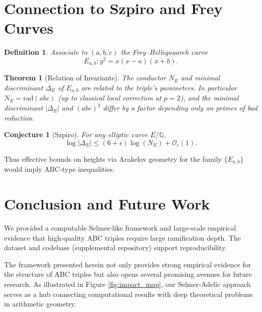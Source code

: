 \documentclass[11pt,a4paper]{article}
\newtheorem{definition}{Definition}[section]
\newtheorem{conjecture}{Conjecture}[section]
\newtheorem{theorem}{Theorem}[section]
\newcommand{\Q}{\mathbb{Q}}
\newcommand{\rad}{\mathrm{rad}}
\begin{document}
\section{Connection to Szpiro and Frey Curves}

\begin{definition}
Associate to $(a,b,c)$ the Frey--Hellegouarch curve
\[
E_{a,b}: y^2 = x(x-a)(x+b).
\]
\end{definition}

\begin{theorem}[Relation of Invariants]
The conductor $N_E$ and minimal discriminant $\Delta_E$ of $E_{a,b}$ are related to the triple's parameters. In particular $N_E=\rad(abc)$ (up to classical local correction at $p=2$), and the minimal discriminant $|\Delta_E|$ and $(abc)^2$ differ by a factor depending only on primes of bad reduction.
\end{theorem}

\begin{conjecture}[Szpiro]
For any elliptic curve $E/\Q$,
\[
\log|\Delta_E| \le (6+\epsilon)\log(N_E) + \mathcal{O}_\epsilon(1).
\]
\end{conjecture}

Thus effective bounds on heights via Arakelov geometry for the family $\{E_{a,b}\}$ would imply ABC-type inequalities.

\section{Conclusion and Future Work}

We provided a computable Selmer-like framework and large-scale empirical evidence that high-quality ABC triples require large ramification depth. The dataset and codebase (supplemental repository) support reproducibility.

The framework presented herein not only provides strong empirical evidence for the structure of ABC triples but also opens several promising avenues for future research. As illustrated in Figure \ref{fig:impact_map}, our Selmer-Adelic approach serves as a hub connecting computational results with deep theoretical problems in arithmetic geometry.
\end{document}
